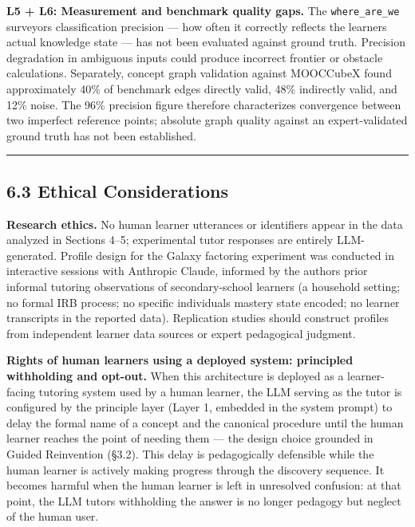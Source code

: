 \documentclass[
]{article}
\begin{document}
\textbf{L5 + L6: Measurement and benchmark quality gaps.} The \texttt{where\_are\_we} surveyor\textquotesingle s classification precision --- how often it correctly reflects the learner\textquotesingle s actual knowledge state --- has not been evaluated against ground truth. Precision degradation in ambiguous inputs could produce incorrect frontier or obstacle calculations. Separately, concept graph validation against MOOCCubeX found approximately 40\% of benchmark edges directly valid, 48\% indirectly valid, and 12\% noise. The 96\% precision figure therefore characterizes convergence between two imperfect reference points; absolute graph quality against an expert-validated ground truth has not been established.

\begin{center}\rule{0.5\linewidth}{0.5pt}\end{center}

\subsection{6.3 Ethical Considerations}\label{63-ethical-considerations}

\textbf{Research ethics.} No human learner utterances or identifiers appear in the data analyzed in Sections 4--5; experimental tutor responses are entirely LLM-generated. Profile design for the Galaxy factoring experiment was conducted in interactive sessions with Anthropic Claude, informed by the author\textquotesingle s prior informal tutoring observations of secondary-school learners (a household setting; no formal IRB process; no specific individual\textquotesingle s mastery state encoded; no learner transcripts in the reported data). Replication studies should construct profiles from independent learner data sources or expert pedagogical judgment.

\textbf{Rights of human learners using a deployed system: principled withholding and opt-out.} When this architecture is deployed as a learner-facing tutoring system used by a human learner, the LLM serving as the tutor is configured by the principle layer (Layer 1, embedded in the system prompt) to delay the formal name of a concept and the canonical procedure until the human learner reaches the point of needing them --- the design choice grounded in Guided Reinvention (§3.2). This delay is pedagogically defensible while the human learner is actively making progress through the discovery sequence. It becomes harmful when the human learner is left in unresolved confusion: at that point, the LLM tutor\textquotesingle s withholding the answer is no longer pedagogy but neglect of the human user.
\end{document}
